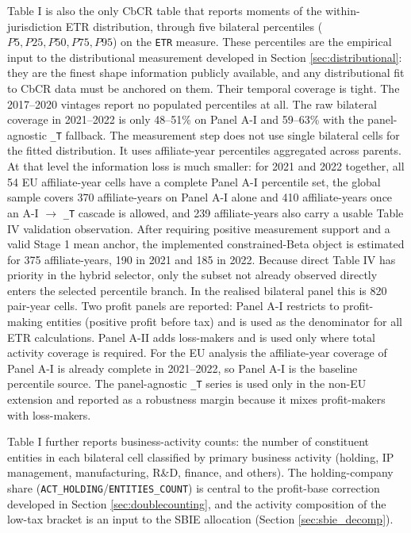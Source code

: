 \documentclass[11pt,a4paper]{article}
\newcommand{\code}[1]{\texttt{#1}}
\begin{document}
Table I is also the only CbCR table that reports moments of the within-jurisdiction ETR distribution, through five bilateral percentiles ($P5, P25, P50, P75, P95$) on the \code{ETR} measure. These percentiles are the empirical input to the distributional measurement developed in Section \ref{sec:distributional}: they are the finest shape information publicly available, and any distributional fit to CbCR data must be anchored on them. Their temporal coverage is tight. The 2017--2020 vintages report no populated percentiles at all. The raw bilateral coverage in 2021--2022 is only 48--51\% on Panel A-I and 59--63\% with the panel-agnostic \code{\_T} fallback. The measurement step does not use single bilateral cells for the fitted distribution. It uses affiliate-year percentiles aggregated across parents. At that level the information loss is much smaller: for 2021 and 2022 together, all 54 EU affiliate-year cells have a complete Panel A-I percentile set, the global sample covers 370 affiliate-years on Panel A-I alone and 410 affiliate-years once an A-I $\rightarrow$ \code{\_T} cascade is allowed, and 239 affiliate-years also carry a usable Table IV validation observation. After requiring positive measurement support and a valid Stage 1 mean anchor, the implemented constrained-Beta object is estimated for 375 affiliate-years, 190 in 2021 and 185 in 2022. Because direct Table IV has priority in the hybrid selector, only the subset not already observed directly enters the selected percentile branch. In the realised bilateral panel this is 820 pair-year cells. Two profit panels are reported: Panel A-I restricts to profit-making entities (positive profit before tax) and is used as the denominator for all ETR calculations. Panel A-II adds loss-makers and is used only where total activity coverage is required. For the EU analysis the affiliate-year coverage of Panel A-I is already complete in 2021--2022, so Panel A-I is the baseline percentile source. The panel-agnostic \code{\_T} series is used only in the non-EU extension and reported as a robustness margin because it mixes profit-makers with loss-makers.

Table I further reports business-activity counts: the number of constituent entities in each bilateral cell classified by primary business activity (holding, IP management, manufacturing, R\&D, finance, and others). The holding-company share (\code{ACT\_HOLDING}/\code{ENTITIES\_COUNT}) is central to the profit-base correction developed in Section \ref{sec:doublecounting}, and the activity composition of the low-tax bracket is an input to the SBIE allocation (Section \ref{sec:sbie_decomp}).
\end{document}
